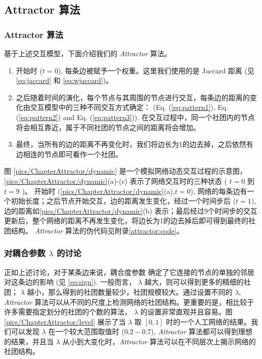 \subsection{Attractor 算法}
\subsubsection{Attractor 算法}
基于上述交互模型，下面介绍我们的 \emph{Attractor} 算法。\par
\begin{enumerate}
\item 开始时 ($t=0$), 每条边被赋予一个权重。这里我们使用的是 Jaccard 距离 (见 \ref{eq:jaccard} 和 \ref{eq:wjaccard})。
\item 之后随着时间的演化，每个节点与其周围的节点进行交互，每条边的距离的变化由交互模型中的三种不同交互方式确定：  (Eq. (\ref{eq:pattern1}), Eq. (\ref{eq:pattern2}) and Eq. (\ref{eq:pattern3})). 在交互过程中，同一个社团内的节点将会相互靠近，属于不同社团的节点之间的距离将会增加。
\item 最终，当所有的边的距离不再变化时，我们将边长为1的边去掉，之后依然有边相连的节点即可看作一个社团。
\end{enumerate}
\vspace{2mm}

图 \ref{pics/ChapterAttractor/dynamic} 是一个模拟网络动态交互过程的示意图， \ref{pics/ChapterAttractor/dynamic}(a)-(c) 表示了网络交互时的三种状态 ( $t=0$ 到 $t=9$ )。 开始时 (\ref{pics/ChapterAttractor/dynamic}(a),$t=0$), 网络的每条边有一个初始长度；之后节点开始交互，边的距离发生变化，经过一个时间步后 ($t=1$), 边的距离如\ref{pics/ChapterAttractor/dynamic}(b) 表示；最后经过9个时间步的交互更新后，整个网络的距离不再发生变化，将边长为1的边去掉后即可得到最终的社团结构。 \emph{Attractor} 算法的伪代码见附录\ref{attractor:code}。

\subsubsection{对耦合参数 $\lambda$ 的讨论}
正如上述讨论，对于某条边来说，耦合度参数  确定了它连接的节点的单独的邻居对这条边的影响 (见 \ref{eq:sign}). 一般而言， $\lambda$ 越大，则可以得到更多的精细的社团； $\lambda$ 越小，那么得到的社团数量较少，社团规模较大。通过设置不同的 $\lambda$, \emph{Attractor} 算法可以从不同的尺度上检测网络的社团结构。更重要的是，相比较于许多需要指定划分的社团的个数的算法， $\lambda$ 的设置非常直观并且容易。图 \ref{pics/ChapterAttractor/level} 展示了当 $\lambda$ 取 $[0,1]$ 时的一个人工网络的结果。我们可以发现 $\lambda$ 在一个较大范围取值时 ($0.2-0.7$), \emph{Attractor} 算法都可以得到理想的结果，并且当 $\lambda$ 从小到大变化时，\emph{Attractor} 算法可以在不同层次上揭示网络的社团结构。


